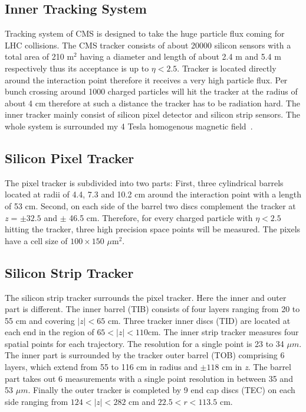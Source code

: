 \subsection{Inner Tracking System}
Tracking system of CMS is designed to take the huge particle
flux coming for LHC collisions. The CMS tracker consists of
about 20000 silicon sensors with a total area of 210 m$^{2}$
having a diameter and length of about 2.4 m and 5.4 m
respectively thus its acceptance is up to $\eta<2.5$. Tracker
is located directly around the interaction point therefore it
receives a very high particle flux. Per bunch crossing around
1000 charged particles will hit the tracker at the radius of
about 4 cm therefore at such a distance the tracker has to be
radiation hard. The inner tracker mainly consist of silicon
pixel detector and silicon strip sensors. The whole system is
surrounded my 4 Tesla homogenous magnetic field~\cite{karim}.



\smallskip
\subsection{Silicon Pixel Tracker}
The pixel tracker is subdivided into two parts: First, three
cylindrical barrels located at radii of 4.4, 7.3 and 10.2 cm
around the interaction point with a length of 53 cm. Second, on
each side of the barrel two discs complement the tracker at
\emph{z} = $\pm32.5$ and $\pm$ 46.5 cm. Therefore, for every
charged particle with $\eta<2.5$ hitting the tracker, three
high precision space points will be measured. The pixels have a
cell size of $100\times150$ $\mu$m$^{2}$.

\smallskip
\subsection{Silicon Strip Tracker}
The silicon strip tracker surrounds the pixel tracker. Here the
inner and outer part is different. The inner barrel (TIB)
consists of four layers ranging from 20 to 55 cm and covering
$|z| < 65$ cm. Three tracker inner discs (TID) are located at
each end in the region of $65<|z|<110 $cm. The inner strip
tracker measures four spatial points for each trajectory. The
resolution for a single point is 23 to 34 $\mu m$. The inner
part is surrounded by the tracker outer barrel (TOB) comprising
6 layers, which extend from 55 to 116 cm in radius and $\pm118$
cm in \emph{z}. The barrel part takes out 6 measurements with a
single point resolution in between 35 and 53 $\mu m$. Finally
the outer tracker is completed by 9 end cap discs (TEC) on each
side ranging from $124 < |z| < 282$ cm and $22.5 < r < 113.5$
cm.

